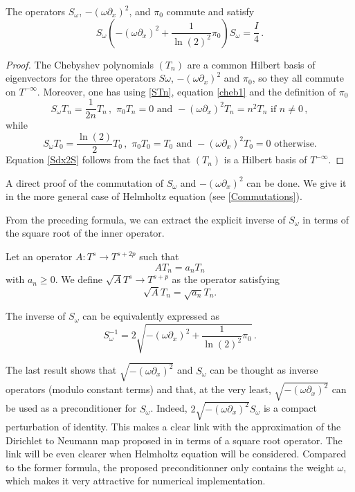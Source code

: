 \documentclass[a4paper]{article}
\begin{document}
	\begin{The}
		\label{TheSdx2S}
		The operators $S_\omega$, $-(\omega\partial_x)^2$, and $\pi_0$ commute and satisfy
		\begin{equation}
		S_{\omega}\left(-(\omega\partial_x)^2 + \frac{1}{\ln(2)^2} \pi_0 \right)S_{\omega} = \frac{I}{4}\,.
		\label{Sdx2S}
		\end{equation}
	\end{The}
	\begin{proof}
		The Chebyshev polynomials $(T_n)$ are a common Hilbert basis of eigenvectors for the three operators $S\omega$, $-(\omega \partial_x)^2$ and $\pi_0$, so they all commute on $T^{-\infty}$. 
		Moreover, one has using \autoref{STn}, equation \eqref{cheb1} and the definition of $\pi_0$
		\[ S_\omega T_n =\frac{1}{2n}T_n\,,\,\, \pi_0 T_n = 0 \mbox{ and } -(\omega\partial_x)^2T_n = n^2 T_n \mbox{ if } n\ne 0\,,\]
		while
		\[ S_\omega T_0 = \frac{\ln(2)}{2} T_0\,,\,\, \pi_0 T_0 = T_0 \mbox{ and } -(\omega\partial_x)^2T_0 = 0 \mbox{ otherwise.}\]
		Equation \eqref{Sdx2S} follows from the fact that $(T_n)$ is a Hilbert basis of $T^{-\infty}$.
	 \end{proof}
	
	\begin{Rem} A direct proof of the commutation of $S_\omega$ and $-(\omega\partial_x)^2$ can be done. We give it in the 
		more general case of Helmholtz equation (see \autoref{Commutations}).
	\end{Rem}	
	From the preceding formula, we can extract the explicit inverse of $S_\omega$ in terms of the square root of the inner operator.
	\begin{Def}
		Let an operator $A : T^s \to T^{s + 2p}$ such that 
		\[AT_n = a_n T_n\]
		with $a_n \geq 0$. We define $\sqrt{A} T^s \to T^{s + p}$ as the operator satisfying 
		\[\sqrt{A}T_n = \sqrt{a_n} T_n.\]
	\end{Def}
	
	\begin{Cor}
		The inverse of $S_\omega$ can be equivalently expressed as 
		\begin{equation}
		S_{\omega}^{-1} = 2\sqrt{-(\omega \partial_x)^2 + \frac{1}{\ln(2)^2}\pi_0}\,.
		\end{equation}
	\end{Cor}
	
	The last result shows that $\sqrt{-(\omega \partial_x)^2}$ and $S_\omega$ can be thought as inverse operators (modulo constant terms) and that, at the very least, $\sqrt{-(\omega \partial_x)^2}$ can be used as a preconditioner for $S_\omega$. Indeed, $2\sqrt{-(\omega \partial_x)^2}S_\omega$ is a compact perturbation of identity. This makes a clear link with the approximation of the Dirichlet to Neumann map proposed in \cite{antoine2007generalized} in terms of a square root operator. The link will be even clearer when Helmholtz equation will be considered. Compared to the former formula, the proposed preconditionner only contains the weight $\omega$, which makes it very attractive for numerical implementation.
	
\end{document}
